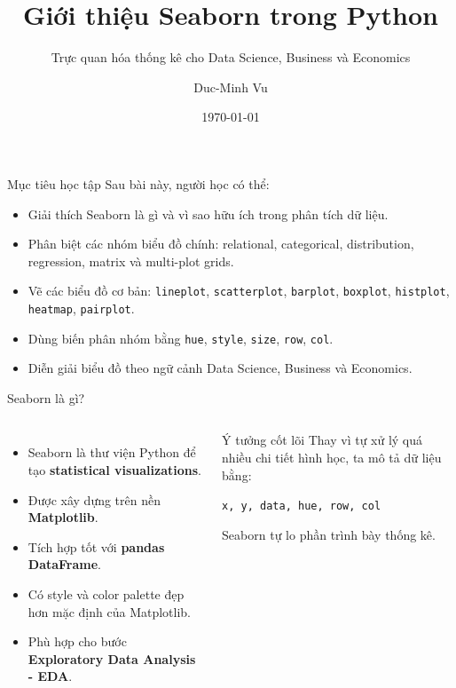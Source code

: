\documentclass[aspectratio=169,11pt]{beamer}
\title[Seaborn trong Python]{Giới thiệu Seaborn trong Python}
\subtitle{Trực quan hóa thống kê cho Data Science, Business và Economics}
\author{Duc-Minh Vu}
\institute{SLSCM Lab -- FDA -- NEU}
\date{\today}
\begin{document}
\begin{frame}
    \titlepage
\end{frame}

\begin{frame}{Mục tiêu học tập}
Sau bài này, người học có thể:
\begin{itemize}
    \item Giải thích Seaborn là gì và vì sao hữu ích trong phân tích dữ liệu.
    \item Phân biệt các nhóm biểu đồ chính: relational, categorical, distribution, regression, matrix và multi-plot grids.
    \item Vẽ các biểu đồ cơ bản: \texttt{lineplot}, \texttt{scatterplot}, \texttt{barplot}, \texttt{boxplot}, \texttt{histplot}, \texttt{heatmap}, \texttt{pairplot}.
    \item Dùng biến phân nhóm bằng \texttt{hue}, \texttt{style}, \texttt{size}, \texttt{row}, \texttt{col}.
    \item Diễn giải biểu đồ theo ngữ cảnh Data Science, Business và Economics.
\end{itemize}
\end{frame}

\begin{frame}{Seaborn là gì?}
\begin{columns}[T,onlytextwidth]
\begin{itemize}
    \item Seaborn là thư viện Python để tạo \textbf{statistical visualizations}.
    \item Được xây dựng trên nền \textbf{Matplotlib}.
    \item Tích hợp tốt với \textbf{pandas DataFrame}.
    \item Có style và color palette đẹp hơn mặc định của Matplotlib.
    \item Phù hợp cho bước \textbf{Exploratory Data Analysis - EDA}.
\end{itemize}

\begin{block}{Ý tưởng cốt lõi}
Thay vì tự xử lý quá nhiều chi tiết hình học, ta mô tả dữ liệu bằng:
\begin{center}
\texttt{x, y, data, hue, row, col}
\end{center}
Seaborn tự lo phần trình bày thống kê.
\end{block}
\end{columns}
\end{frame}
\end{document}
